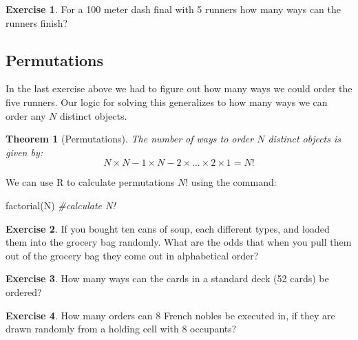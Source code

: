 \documentclass[
]{book}
\newenvironment{Shaded}{\begin{snugshade}}{\end{snugshade}}
\newcommand{\CommentTok}[1]{\textcolor[rgb]{0.56,0.35,0.01}{\textit{#1}}}
\newcommand{\FunctionTok}[1]{\textcolor[rgb]{0.00,0.00,0.00}{#1}}
\newcommand{\NormalTok}[1]{#1}
\newtheorem{theorem}{Theorem}[chapter]
\theoremstyle{definition}
\theoremstyle{definition}
\theoremstyle{definition}
\newtheorem{exercise}{Exercise}[chapter]
\theoremstyle{definition}
\theoremstyle{remark}
\begin{document}
\begin{exercise}
\protect\hypertarget{exr:unnamed-chunk-212}{}\label{exr:unnamed-chunk-212}For a 100 meter dash final with 5 runners how many ways can the runners finish?
\end{exercise}

\hypertarget{permutations}{%
\subsection{Permutations}\label{permutations}}

In the last exercise above we had to figure out how many ways we could order the five runners. Our logic for solving this generalizes to how many ways we can order any \(N\) distinct objects.

\begin{theorem}[Permutations]
\protect\hypertarget{thm:unnamed-chunk-213}{}\label{thm:unnamed-chunk-213}The number of ways to order \(N\) distinct objects is given by: \[N \times N-1 \times N-2 \times ... \times 2 \times 1=N!\]
\end{theorem}

We can use R to calculate permutations \(N!\) using the command:

\begin{Shaded}
\begin{Highlighting}[]
\FunctionTok{factorial}\NormalTok{(N)  }\CommentTok{\#calculate N!}
\end{Highlighting}
\end{Shaded}

\begin{exercise}
\protect\hypertarget{exr:unnamed-chunk-215}{}\label{exr:unnamed-chunk-215}If you bought ten cans of soup, each different types, and loaded them into the grocery bag randomly. What are the odds that when you pull them out of the grocery bag they come out in alphabetical order?
\end{exercise}

\begin{exercise}
\protect\hypertarget{exr:unnamed-chunk-216}{}\label{exr:unnamed-chunk-216}How many ways can the cards in a standard deck (52 cards) be ordered?
\end{exercise}

\begin{exercise}
\protect\hypertarget{exr:unnamed-chunk-217}{}\label{exr:unnamed-chunk-217}How many orders can 8 French nobles be executed in, if they are drawn randomly from a holding cell with 8 occupants?
\end{exercise}
\end{document}
